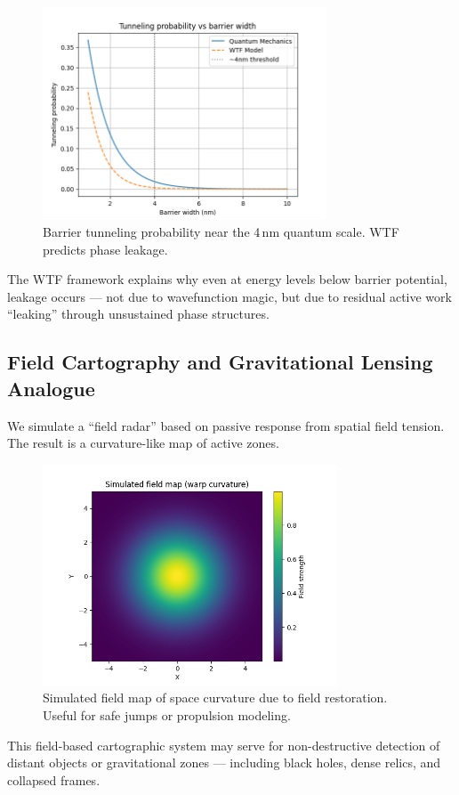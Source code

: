 \begin{figure}[h!]
    \centering
    \includegraphics[width=0.75\textwidth]{figures/tunneling_vs_width_4nm.png}
    \caption{Barrier tunneling probability near the 4 nm quantum scale. WTF predicts phase leakage.}
\end{figure}

The WTF framework explains why even at energy levels below barrier potential, leakage occurs — not due to wavefunction magic, but due to residual active work “leaking” through unsustained phase structures.

\vspace{10pt}

\subsection{Field Cartography and Gravitational Lensing Analogue}

We simulate a “field radar” based on passive response from spatial field tension. The result is a curvature-like map of active zones.

\begin{figure}[h!]
    \centering
    \includegraphics[width=0.78\textwidth]{figures/gravi_map_final.png}
    \caption{Simulated field map of space curvature due to field restoration. Useful for safe jumps or propulsion modeling.}
\end{figure}

This field-based cartographic system may serve for non-destructive detection of distant objects or gravitational zones — including black holes, dense relics, and collapsed frames.
